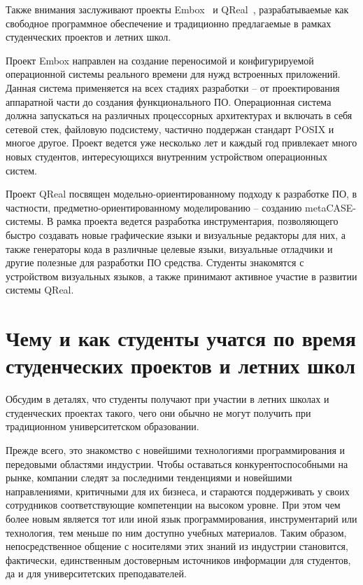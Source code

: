 \documentclass[a4paper]{article}
\begin{document}
Также внимания заслуживают проекты Embox~\cite{embox} и QReal~\cite{qreal2, qreal3, qreal}, разрабатываемые как свободное программное обеспечение и традиционно предлагаемые в рамках студенческих проектов и летних школ. 

Проект Embox направлен на создание переносимой  и конфигурируемой операционной системы реального времени для нужд встроенных приложений. Данная система применяется на всех стадиях разработки -- от проектирования аппаратной части до создания функционального ПО. Операционная система  должна запускаться на различных процессорных архитектурах и включать в себя сетевой стек, файловую подсистему, частично поддержан стандарт POSIX и многое другое. Проект ведется уже несколько лет и каждый год привлекает много новых студентов, интересующихся внутренним устройством операционных систем.  

Проект QReal посвящен модельно-ориентированному подходу к разработке ПО, в частности, предметно-ориентированному моделированию -- созданию metaCASE-системы. В рамка проекта ведется разработка инструментария, позволяющего быстро создавать новые графические языки и визуальные редакторы для них, а также генераторы кода в различные целевые языки, визуальные отладчики и другие полезные для разработки ПО средства. Студенты знакомятся с устройством визуальных языков, а также принимают активное участие в развитии системы QReal.

\section{Чему и как студенты учатся по время студенческих проектов и летних школ}

Обсудим в деталях, что студенты получают при участии в летних школах и студенческих проектах такого, чего они обычно не могут получить при традиционном университетском образовании.

Прежде всего, это знакомство с новейшими технологиями программирования и передовыми областями индустрии. Чтобы оставаться конкурентоспособными на рынке, компании следят за последними тенденциями и новейшими направлениями, критичными для их бизнеса, и стараются поддерживать у своих сотрудников соответствующие компетенции на высоком уровне. При этом чем более новым является тот или иной язык программирования, инструментарий или технология, тем меньше по ним доступно учебных материалов. Таким образом, непосредственное общение с носителями этих знаний из индустрии становится, фактически, единственным достоверным источников информации для студентов, да и для университетских преподавателей.  
\end{document}
